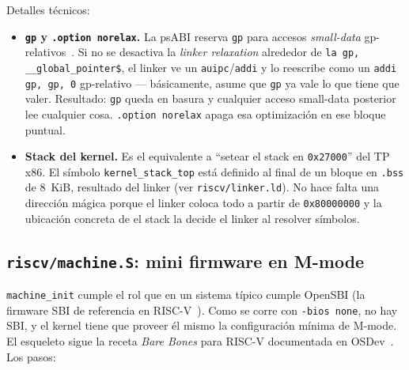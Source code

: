 Detalles técnicos:

\begin{itemize}
  \item \textbf{\texttt{gp} y \texttt{.option norelax}.} La psABI reserva \texttt{gp} para accesos \emph{small-data}
  gp-relativos~\cite{riscv-psabi}. Si no se desactiva la \emph{linker relaxation} alrededor de \texttt{la gp,
  \_\_global\_pointer\$}, el linker ve un \texttt{auipc}/\texttt{addi} y lo reescribe como un \texttt{addi gp, gp, 0}
  gp-relativo --- básicamente, asume que \texttt{gp} ya vale lo que tiene que valer. Resultado: \texttt{gp} queda en
  basura y cualquier acceso small-data posterior lee cualquier cosa. \texttt{.option norelax} apaga esa optimización en
  ese bloque puntual.

  \item \textbf{Stack del kernel.} Es el equivalente a ``setear el stack en \texttt{0x27000}'' del TP x86. El símbolo
  \texttt{kernel\_stack\_top} está definido al final de un bloque en \texttt{.bss} de 8~KiB, resultado del linker (ver
  \texttt{riscv/linker.ld}). No hace falta una dirección mágica porque el linker coloca todo a partir de
  \texttt{0x80000000} y la ubicación concreta de el stack la decide el linker al resolver símbolos.
\end{itemize}

\subsection{\texttt{riscv/machine.S}: mini firmware en M-mode}
\label{sec:machine}

\texttt{machine\_init} cumple el rol que en un sistema típico cumple OpenSBI (la firmware SBI de referencia en
RISC-V~\cite{riscv-sbi}). Como se corre con \texttt{-bios none}, no hay SBI, y el kernel tiene que proveer él mismo la
configuración mínima de M-mode. El esqueleto sigue la receta \emph{Bare Bones} para RISC-V documentada en
OSDev~\cite{osdev-riscv}. Los pasos:

